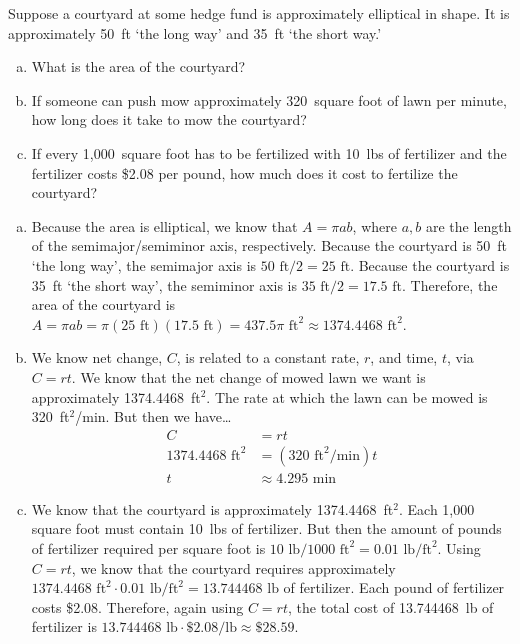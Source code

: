 \documentclass[11pt,letterpaper]{article}
\begin{document}
\newpage



 Suppose a courtyard at some hedge fund is approximately elliptical in shape. It is approximately 50~ft `the long way' and 35~ft `the short way.'
	\begin{enumerate}[(a)]
	\item What is the area of the courtyard?
	\item If someone can push mow approximately 320~square foot of lawn per minute, how long does it take to mow the courtyard?
	\item If every 1,000~square foot has to be fertilized with 10~lbs of fertilizer and the fertilizer costs \$2.08 per pound, how much does it cost to fertilize the courtyard?
	\end{enumerate} \pspace

\sol 
\begin{enumerate}[(a)]
\item Because the area is elliptical, we know that $A= \pi a b$, where $a, b$ are the length of the semimajor/semiminor axis, respectively. Because the courtyard is 50~ft `the long way', the semimajor axis is $50 \text{ ft}/2= 25 \text{ ft}$. Because the courtyard is 35~ft `the short way', the semiminor axis is $35 \text{ ft}/2= 17.5 \text{ ft}$. Therefore, the area of the courtyard is $A= \pi a b= \pi (25 \text{ ft})(17.5 \text{ ft})= 437.5\pi \text{ ft}^2 \approx 1374.4468 \text{ ft}^2$. \pspace

\item We know net change, $C$, is related to a constant rate, $r$, and time, $t$, via $C= rt$. We know that the net change of mowed lawn we want is approximately 1374.4468~ft$^2$. The rate at which the lawn can be mowed is 320~ft$^2$/min. But then we have\dots
	\[
	\begin{aligned}
	C&= rt \\[0.3cm]
	1374.4468 \text{ ft}^2&= (320 \text{ ft}^2/\text{min}) t \\[0.3cm]
	t&\approx 4.295 \text{ min}
	\end{aligned}
	\]

\item We know that the courtyard is approximately 1374.4468~ft$^2$. Each 1,000 square foot must contain 10~lbs of fertilizer. But then the amount of pounds of fertilizer required per square foot is $10 \text{ lb}/1000 \text{ ft}^2= 0.01 \text{ lb}/\text{ft}^2$. Using $C= rt$, we know that the courtyard requires approximately $1374.4468 \text{ ft}^2 \cdot 0.01 \text{ lb}/\text{ft}^2= 13.744468 \text{ lb}$ of fertilizer. Each pound of fertilizer costs \$2.08. Therefore, again using $C= rt$, the total cost of 13.744468~lb of fertilizer is $13.744468 \text{ lb} \cdot \$2.08/\text{lb} \approx \$28.59$. 
\end{enumerate}
\end{document}
